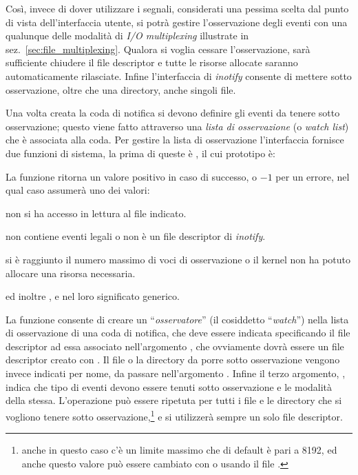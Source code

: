 Così, invece di dover utilizzare i segnali, considerati una pessima scelta dal
punto di vista dell'interfaccia utente, si potrà gestire l'osservazione degli
eventi con una qualunque delle modalità di \textit{I/O multiplexing}
illustrate in sez.~\ref{sec:file_multiplexing}. Qualora si voglia cessare
l'osservazione, sarà sufficiente chiudere il file descriptor e tutte le
risorse allocate saranno automaticamente rilasciate. Infine l'interfaccia di
\textit{inotify} consente di mettere sotto osservazione, oltre che una
directory, anche singoli file.

Una volta creata la coda di notifica si devono definire gli eventi da tenere
sotto osservazione; questo viene fatto attraverso una \textsl{lista di
  osservazione} (o \textit{watch list}) che è associata alla coda. Per gestire
la lista di osservazione l'interfaccia fornisce due funzioni di sistema, la
prima di queste è , il cui prototipo è:

\begin{funcproto}{
}

{La funzione ritorna un valore positivo in caso di successo, o $-1$ per un
  errore, nel qual caso  assumerà uno dei valori:
  \begin{errlist}
  \item[\errcode{EACCES}] non si ha accesso in lettura al file indicato.
  \item[\errcode{EINVAL}]  non contiene eventi legali o 
    non è un file descriptor di \textit{inotify}.
  \item[\errcode{ENOSPC}] si è raggiunto il numero massimo di voci di
    osservazione o il kernel non ha potuto allocare una risorsa necessaria.
  \end{errlist}
  ed inoltre ,  e  nel loro
  significato generico.}
\end{funcproto}

La funzione consente di creare un ``\textsl{osservatore}'' (il cosiddetto
``\textit{watch}'') nella lista di osservazione di una coda di notifica, che
deve essere indicata specificando il file descriptor ad essa associato
nell'argomento , che ovviamente dovrà essere un file descriptor
creato con .  Il file o la directory da porre sotto
osservazione vengono invece indicati per nome, da passare
nell'argomento .  Infine il terzo argomento, ,
indica che tipo di eventi devono essere tenuti sotto osservazione e le
modalità della stessa.  L'operazione può essere ripetuta per tutti i file e le
directory che si vogliono tenere sotto osservazione,\footnote{anche in questo
  caso c'è un limite massimo che di default è pari a 8192, ed anche questo
  valore può essere cambiato con  o usando il file
  .} e si utilizzerà sempre un solo
file descriptor.

